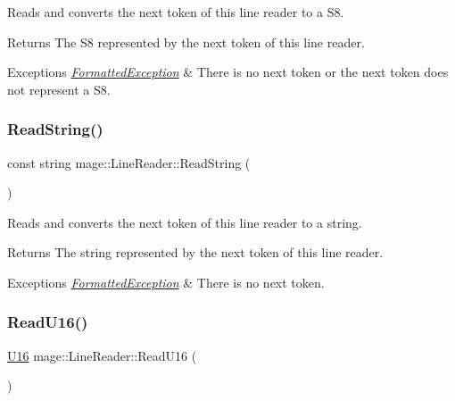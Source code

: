 Reads and converts the next token of this line reader to a {\ttfamily S8}.

\begin{DoxyReturn}{Returns}
The {\ttfamily S8} represented by the next token of this line reader. 
\end{DoxyReturn}

\begin{DoxyExceptions}{Exceptions}
{\em \hyperlink{structmage_1_1_formatted_exception}{Formatted\+Exception}} & There is no next token or the next token does not represent a {\ttfamily S8}. \\
\hline
\end{DoxyExceptions}
\hypertarget{classmage_1_1_line_reader_a58a27b637574ce56ea17a575aa540675}{}\label{classmage_1_1_line_reader_a58a27b637574ce56ea17a575aa540675} 
\subsubsection{\texorpdfstring{Read\+String()}{ReadString()}}
{\footnotesize\ttfamily const string mage\+::\+Line\+Reader\+::\+Read\+String (\begin{DoxyParamCaption}{ }\end{DoxyParamCaption})\hspace{0.3cm}{\ttfamily [protected]}}

Reads and converts the next token of this line reader to a string.

\begin{DoxyReturn}{Returns}
The string represented by the next token of this line reader. 
\end{DoxyReturn}

\begin{DoxyExceptions}{Exceptions}
{\em \hyperlink{structmage_1_1_formatted_exception}{Formatted\+Exception}} & There is no next token. \\
\hline
\end{DoxyExceptions}
\hypertarget{classmage_1_1_line_reader_ac182214e611518cb8b8c1f8cd6b08f0c}{}\label{classmage_1_1_line_reader_ac182214e611518cb8b8c1f8cd6b08f0c} 
\subsubsection{\texorpdfstring{Read\+U16()}{ReadU16()}}
{\footnotesize\ttfamily \hyperlink{namespacemage_af69057eec1ce005c1c3b34ae33486f16}{U16} mage\+::\+Line\+Reader\+::\+Read\+U16 (\begin{DoxyParamCaption}{ }\end{DoxyParamCaption})\hspace{0.3cm}{\ttfamily [protected]}}

